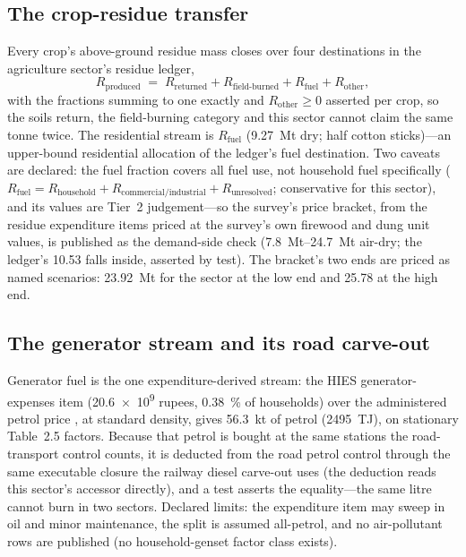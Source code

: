 \subsection{The crop-residue transfer}

Every crop's above-ground residue mass closes over four destinations in the agriculture
sector's residue ledger,
\begin{equation}
R_{\text{produced}} \;=\; R_{\text{returned}} + R_{\text{field-burned}} +
R_{\text{fuel}} + R_{\text{other}},
\end{equation}
with the fractions summing to one exactly and $R_{\text{other}} \geq 0$ asserted per
crop, so the soils return, the field-burning category and this sector cannot claim the
same tonne twice. The residential stream is $R_{\text{fuel}}$ (\SI{9.27}{\mega\tonne}
dry; half cotton sticks)---an upper-bound residential allocation of the ledger's
fuel destination. Two caveats are declared: the fuel fraction covers all fuel use, not
household fuel specifically ($R_{\text{fuel}} = R_{\text{household}} +
R_{\text{commercial/industrial}} + R_{\text{unresolved}}$; conservative for this
sector), and its values are Tier~2 judgement---so the survey's price bracket, from the residue expenditure items
priced at the survey's own firewood and dung unit values, is published as the
demand-side check (\SIrange{7.8}{24.7}{\mega\tonne} air-dry; the ledger's \SI{10.53}{}
falls inside, asserted by test). The bracket's two ends are priced as named scenarios:
\SI{23.92}{\mega\tonne} for the sector at the low end and \SI{25.78}{} at the high end.

\subsection{The generator stream and its road carve-out}

Generator fuel is the one expenditure-derived stream: the HIES generator-expenses item
(\SI{20.6e9}{} rupees, \SI{0.38}{\percent} of households) over the administered petrol
price \citep{goppetrol}, at standard density, gives \SI{56.3}{\kilo\tonne} of petrol
(\SI{2495}{\tera\joule}), on stationary Table~2.5 factors. Because that petrol is
bought at the same stations the road-transport control counts, it is deducted from the
road petrol control through the same executable closure the railway diesel carve-out
uses (the deduction reads this sector's accessor directly), and a test asserts the
equality---the same litre cannot burn in two
sectors. Declared limits: the expenditure item may sweep in oil and minor maintenance,
the split is assumed all-petrol, and no air-pollutant rows are published (no
household-genset factor class exists).

